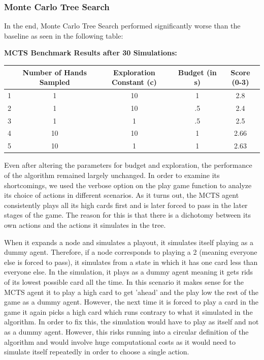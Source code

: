 \documentclass[11pt]{article}
\begin{document}
\subsubsection{Monte Carlo Tree Search}

In the end, Monte Carlo Tree Search performed significantly worse than the baseline as seen in the following table:

\begin{center}
\textbf{MCTS Benchmark Results after 30 Simulations:}\\
\begin{tabular}{ c|c|c|c|c } 
 \hline

  & Number of Hands Sampled & Exploration Constant (c) & Budget (in s) & Score  (0-3)\\ 
\hline
 1 & 1 & 10 &  1 & 2.8\\ 
 2 & 1& 10 & .5 & 2.4 \\
3 & 1 & 1 & .5 & 2.5\\
4 & 10 & 10 & 1 & 2.66 \\
5 & 10 & 1 & 1  & 2.63 \\
 \hline
\end{tabular}
\end{center}
Even after altering the parameters for budget and exploration, the performance of the algorithm remained largely unchanged. In order to examine its shortcomings, we used the verbose option on the play game function to analyze its choice of actions in different scenarios. As it turns out, the MCTS agent consistently plays all its high cards first and is later forced to pass in the later stages of the game. The reason for this is that there is a dichotomy between its own actions and the actions it simulates in the tree. 

When it expands a node and simulates a playout, it simulates itself playing as a dummy agent. Therefore, if a node corresponds to playing a 2 (meaning everyone else is forced to pass), it simulates from a state in which it has one card less than everyone else. In the simulation, it plays as a dummy agent meaning it gets rids of its lowest possible card all the time. In this scenario it makes sense for the MCTS agent it to play a high card to get 'ahead' and the play low the rest of the game as a dummy agent. However, the next time it is forced to play a card in the game it again picks a high card which runs contrary to what it simulated in the algorithm. In order to fix this, the simulation would have to play as itself and not as a dummy agent. However, this risks running into a circular definition of the algorithm and would involve huge computational costs as it would need to simulate itself repeatedly in order to choose a single action.
\end{document}
